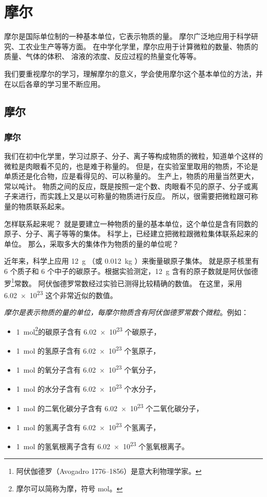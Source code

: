 \chapter{摩尔}\label{chp:mol}
摩尔是国际单位制的一种基本单位，它表示物质的量。
摩尔广泛地应用于科学研究、工农业生产等等方面。
在中学化学里，摩尔应用于计算微粒的数量、物质的质量、气体的体积、 溶液的浓度、反应过程的热量变化等等。

我们要重视摩尔的学习，理解摩尔的意义，学会使用摩尔这个基本单位的方法，并在以后各章的学习里不断应用。

\section{摩尔}
\subsection{摩尔}
我们在初中化学里，学习过原子、分子、离子等构成物质的微粒，知道单个这样的微粒是肉眼看不见的，也是难于称量的。
但是，在实验室里取用的物质，不论是单质还是化合物，应是看得见的、可以称量的。
生产上，物质的用量当然更大，常以吨计。
物质之间的反应，既是按照一定个数、肉眼看不见的原子、分子或离子来进行，而实践上又是以可称量的物质进行反应。
所以，很需要把微粒跟可称量的物质联系起来。

怎样联系起来呢？ 就是要建立一种物质的量的基本单位，这个单位是含有同数的原子、分子、离子等等的集体。
科学上，已经建立把微粒跟微粒集体联系起来的单位。
那么，采取多大的集体作为物质的量的单位呢？

近年来，科学上应用 \qty{12}{g} （或 \qty{0.012}{kg} ）来衡量碳原子集体。 就是原子核里有 6 个质子和 6 个中子的碳原子。根据实验测定，\qty{12}{g}  含有的原子数就是阿伏伽德罗\footnote{阿伏伽德罗（Avogadro 1776--1856）是意大利物理学家。}常数。
阿伏伽德罗常数经过实验已测得比较精确的数值。
在这里，采用 \num{6.02e23} 这个非常近似的数值。

\emph{摩尔是表示物质的量的单位，每摩尔物质含有阿伏伽德罗常数个微粒}。例如：
\begin{itemize}[label={},labelsep=0pt]
  \item \qty{1}{mol}\footnote{摩尔可以简称为摩，符号 \unit{mol}。}的碳原子含有 \num{6.02e23} 个碳原子，
  \item \qty{1}{mol} 的氢原子含有 \num{6.02e23} 个氢原子，
  \item \qty{1}{mol} 的氧分子含有 \num{6.02e23} 个氧分子，
  \item \qty{1}{mol} 的水分子含有 \num{6.02e23} 个水分子，
  \item \qty{1}{mol} 的二氧化碳分子含有 \num{6.02e23} 个二氧化碳分子，
  \item \qty{1}{mol} 的氢离子含有 \num{6.02e23} 个氢离子，
  \item \qty{1}{mol} 的氢氧根离子含有 \num{6.02e23} 个氢氧根离子。
\end{itemize}

